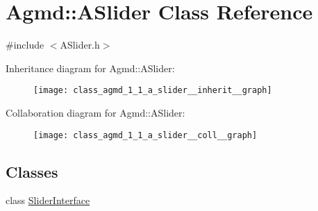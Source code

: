 \hypertarget{class_agmd_1_1_a_slider}{\section{Agmd\+:\+:A\+Slider Class Reference}
\label{class_agmd_1_1_a_slider}
}


{\ttfamily \#include $<$A\+Slider.\+h$>$}



Inheritance diagram for Agmd\+:\+:A\+Slider\+:\nopagebreak
\begin{figure}[H]
\begin{center}
\leavevmode
\texttt{[image: class\_agmd\_1\_1\_a\_slider\_\_inherit\_\_graph]}
\end{center}
\end{figure}


Collaboration diagram for Agmd\+:\+:A\+Slider\+:\nopagebreak
\begin{figure}[H]
\begin{center}
\leavevmode
\texttt{[image: class\_agmd\_1\_1\_a\_slider\_\_coll\_\_graph]}
\end{center}
\end{figure}
\subsection*{Classes}
\begin{DoxyCompactItemize}
\item 
class \hyperlink{class_agmd_1_1_a_slider_1_1_slider_interface}{Slider\+Interface}
\end{DoxyCompactItemize}
